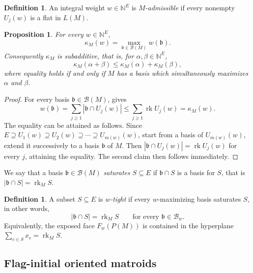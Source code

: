 \documentclass[10pt]{amsart}
\theoremstyle{plain}
\newtheorem{proposition}[theorem]{Proposition}
\theoremstyle{definition}
\newtheorem{definition}[theorem]{Definition}
\newcommand{\NN}{\mathbb{N}}
\newcommand{\B}{\mathcal{B}}
\newcommand{\rk}{\operatorname{rk}}
\newcommand{\bb}{\mathfrak{b}}
\begin{document}
\begin{definition}
An integral weight $w\in\NN^E$ is \emph{$M$-admissible} if every nonempty $U_j(w)$ is a flat in $L(M)$.
\end{definition}


\begin{proposition}\label{kappa-support}
For every $w\in\NN^E$,
\[
\kappa_M(w)=\max_{\bb\in\B(M)}w(\bb).
\]
Consequently $\kappa_M$ is subadditive, that is, for $\alpha,\beta\in\NN^E$,
\[
\kappa_M(\alpha+\beta)\leq\kappa_M(\alpha)+\kappa_M(\beta),
\]
where equality holds if and only if $M$ has a basis which simultaneously maximizes $\alpha$ and $\beta$.
\end{proposition}

\begin{proof}
For every basis $\bb\in\B(M)$,  gives
\[
w(\bb)=\sum_{j\geq 1}|\bb\cap U_j(w)|\leq\sum_{j\geq 1}\rk U_j(w)=\kappa_M(w).
\]
The equality can be attained as follows. Since $E\supseteq U_1(w)\supseteq U_2(w)\supseteq\cdots \supseteq U_{m(w)}(w)$, start from a basis of $U_{m(w)}(w)$, extend it successively to a basis $\bb$ of $M$. Then $|\bb\cap U_j(w)|=\rk U_j(w)$ for every $j$, attaining the equality. The second claim then follows immediately.
\end{proof}

We say that a basis $\bb\in\B(M)$ \emph{saturates} $S\subseteq E$ if $\bb\cap S$ is a basis for $S$, that is $|\bb\cap S|=\rk_M S$.

\begin{definition}\label{w-tight}
A subset $S\subseteq E$ is \emph{$w$-tight} if every $w$-maximizing basis saturates $S$, in other words,
\[
|\bb\cap S|=\rk_M S\qquad\text{for every }\bb\in\B_w.
\]
Equivalently, the exposed face $F_w(P(M))$ is contained in the hyperplane $\sum_{e\in S}x_e=\rk_M S$.
\end{definition}



\subsection{Flag-initial oriented matroids}
\end{document}
